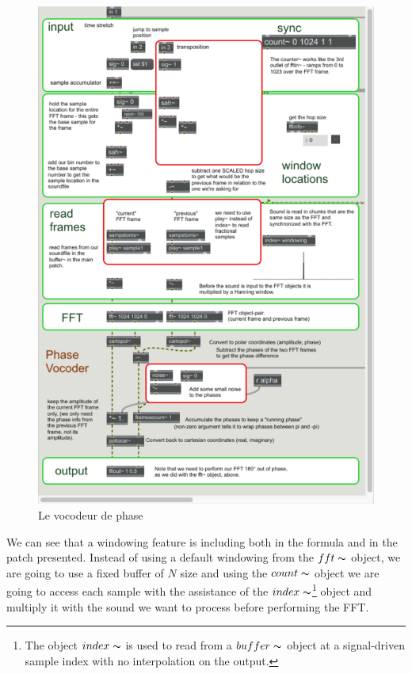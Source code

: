     \begin{figure}
        \centering
        \includegraphics[width = \textwidth]{Graphs/PhaseVocoder.png}
        \caption{Le vocodeur de phase}
        \label{Phasevocoder}
    \end{figure}
    
We can see that a windowing feature is including both in the formula and in the patch presented. Instead of using a default windowing from the $fft\thicksim$ object, we are going to use a fixed buffer of $N$ size and using the $count\thicksim$ object we are going to access each sample with the assistance of the $index\thicksim$\footnote{The object $index\thicksim$ is used to read from a $buffer\thicksim$ object at a signal-driven sample index with no interpolation on the output.} object and multiply it with the sound we want to process before performing the FFT. 

